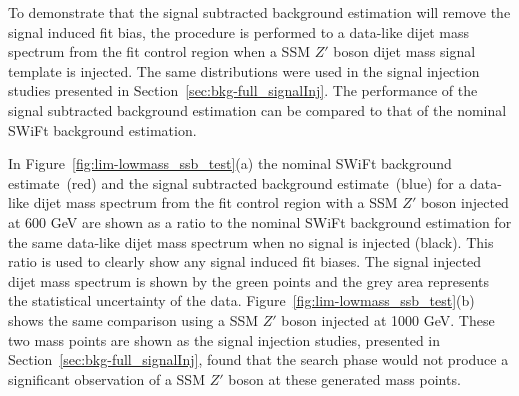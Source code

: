 To demonstrate that the signal subtracted background estimation will remove the signal induced fit bias,
the procedure is performed to a data-like dijet mass spectrum from the fit control region when a SSM $Z'$ boson dijet mass signal template is injected.
The same distributions were used in the signal injection studies presented in Section~\ref{sec:bkg-full_signalInj}.
The performance of the signal subtracted background estimation can be compared to that of the nominal SWiFt background estimation.

In Figure~\ref{fig:lim-lowmass_ssb_test}(a) the nominal SWiFt background estimate~(red) and the signal subtracted background estimate~(blue)
for a data-like dijet mass spectrum from the fit control region with a SSM $Z'$ boson injected at 600 GeV are
shown as a ratio to the nominal SWiFt background estimation for the same data-like dijet mass spectrum when no signal is injected (black).
This ratio is used to clearly show any signal induced fit biases.
The signal injected dijet mass spectrum is shown by the green points and the grey area represents the statistical uncertainty of the data.
Figure~\ref{fig:lim-lowmass_ssb_test}(b) shows the same comparison using a SSM $Z'$ boson injected at 1000 GeV.
These two mass points are shown as the signal injection studies, presented in Section~\ref{sec:bkg-full_signalInj},
found that the search phase would not produce a significant observation of a SSM $Z'$ boson at these generated mass points. 

